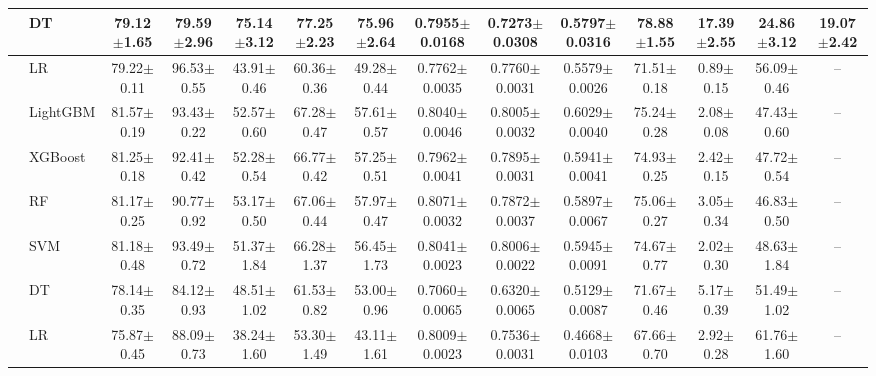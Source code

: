 \begin{tabular}{@{}llcccccccccccc@{}}
 & DT & 79.12{\tiny$\pm$1.65} & 79.59{\tiny$\pm$2.96} & 75.14{\tiny$\pm$3.12} & 77.25{\tiny$\pm$2.23} & 75.96{\tiny$\pm$2.64} & 0.7955{\tiny$\pm$0.0168} & 0.7273{\tiny$\pm$0.0308} & 0.5797{\tiny$\pm$0.0316} & 78.88{\tiny$\pm$1.55} & 17.39{\tiny$\pm$2.55} & 24.86{\tiny$\pm$3.12} & 19.07{\tiny$\pm$2.42}\\
\midrule
{} & LR & 79.22{\tiny$\pm$0.11} & 96.53{\tiny$\pm$0.55} & 43.91{\tiny$\pm$0.46} & 60.36{\tiny$\pm$0.36} & 49.28{\tiny$\pm$0.44} & 0.7762{\tiny$\pm$0.0035} & 0.7760{\tiny$\pm$0.0031} & 0.5579{\tiny$\pm$0.0026} & 71.51{\tiny$\pm$0.18} & 0.89{\tiny$\pm$0.15} & 56.09{\tiny$\pm$0.46} & --\\
 & LightGBM & 81.57{\tiny$\pm$0.19} & 93.43{\tiny$\pm$0.22} & 52.57{\tiny$\pm$0.60} & 67.28{\tiny$\pm$0.47} & 57.61{\tiny$\pm$0.57} & 0.8040{\tiny$\pm$0.0046} & 0.8005{\tiny$\pm$0.0032} & 0.6029{\tiny$\pm$0.0040} & 75.24{\tiny$\pm$0.28} & 2.08{\tiny$\pm$0.08} & 47.43{\tiny$\pm$0.60} & --\\
 & XGBoost & 81.25{\tiny$\pm$0.18} & 92.41{\tiny$\pm$0.42} & 52.28{\tiny$\pm$0.54} & 66.77{\tiny$\pm$0.42} & 57.25{\tiny$\pm$0.51} & 0.7962{\tiny$\pm$0.0041} & 0.7895{\tiny$\pm$0.0031} & 0.5941{\tiny$\pm$0.0041} & 74.93{\tiny$\pm$0.25} & 2.42{\tiny$\pm$0.15} & 47.72{\tiny$\pm$0.54} & --\\
 & RF & 81.17{\tiny$\pm$0.25} & 90.77{\tiny$\pm$0.92} & 53.17{\tiny$\pm$0.50} & 67.06{\tiny$\pm$0.44} & 57.97{\tiny$\pm$0.47} & 0.8071{\tiny$\pm$0.0032} & 0.7872{\tiny$\pm$0.0037} & 0.5897{\tiny$\pm$0.0067} & 75.06{\tiny$\pm$0.27} & 3.05{\tiny$\pm$0.34} & 46.83{\tiny$\pm$0.50} & --\\
 & SVM & 81.18{\tiny$\pm$0.48} & 93.49{\tiny$\pm$0.72} & 51.37{\tiny$\pm$1.84} & 66.28{\tiny$\pm$1.37} & 56.45{\tiny$\pm$1.73} & 0.8041{\tiny$\pm$0.0023} & 0.8006{\tiny$\pm$0.0022} & 0.5945{\tiny$\pm$0.0091} & 74.67{\tiny$\pm$0.77} & 2.02{\tiny$\pm$0.30} & 48.63{\tiny$\pm$1.84} & --\\
 & DT & 78.14{\tiny$\pm$0.35} & 84.12{\tiny$\pm$0.93} & 48.51{\tiny$\pm$1.02} & 61.53{\tiny$\pm$0.82} & 53.00{\tiny$\pm$0.96} & 0.7060{\tiny$\pm$0.0065} & 0.6320{\tiny$\pm$0.0065} & 0.5129{\tiny$\pm$0.0087} & 71.67{\tiny$\pm$0.46} & 5.17{\tiny$\pm$0.39} & 51.49{\tiny$\pm$1.02} & --\\
\midrule
{} & LR & 75.87{\tiny$\pm$0.45} & 88.09{\tiny$\pm$0.73} & 38.24{\tiny$\pm$1.60} & 53.30{\tiny$\pm$1.49} & 43.11{\tiny$\pm$1.61} & 0.8009{\tiny$\pm$0.0023} & 0.7536{\tiny$\pm$0.0031} & 0.4668{\tiny$\pm$0.0103} & 67.66{\tiny$\pm$0.70} & 2.92{\tiny$\pm$0.28} & 61.76{\tiny$\pm$1.60} & --\\

\end{tabular}
